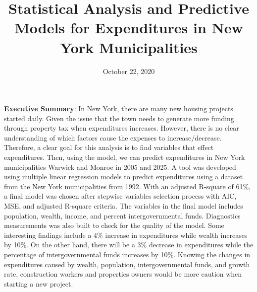 \documentclass[11pt]{article}\usepackage[]{graphicx}\usepackage[]{color}
\title{Statistical Analysis and Predictive Models for Expenditures in New York Municipalities\vspace{-5ex}}
\date{October 22, 2020\vspace{-5ex}}
\begin{document}
 
\maketitle
\hfill \break










\noindent\textbf{\underline{Executive Summary}}: In New York, there are many new housing projects started daily. Given the issue that the town needs to generate more funding through property tax when expenditures increases. However, there is no clear understanding of which factors cause the expenses to increase/decrease. Therefore, a clear goal for this analysis is to find variables that effect expenditures. Then, using the model, we can predict expenditures in New York municipalities Warwick and Monroe in 2005 and 2025. A tool was developed using multiple linear regression models to predict expenditures using a dataset from the New York municipalities from 1992. With an adjusted R-square of 61\%, a final model was chosen after stepwise variables selection process with AIC, MSE, and adjusted R-square criteria. The variables in the final model includes population, wealth, income, and percent intergovernmental funds. Diagnostics measurements was also built to check for the quality of the model. Some interesting findings include a 4\% increase in expenditures while wealth increases by 10\%. On the other hand, there will be a 3\% decrease in expenditures while the percentage of intergovernmental funds increases by 10\%. Knowing the changes in expenditures caused by wealth, population, intergovernmental funds, and growth rate, construction workers and properties owners would be more caution when starting a new project.            
\hfill \break
\end{document}
